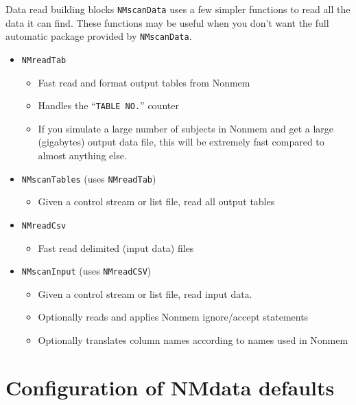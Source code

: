 \documentclass[
  8pt,
  ignorenonframetext,
  aspectratio=169]{beamer}
\providecommand{\tightlist}{%
  \setlength{\itemsep}{0pt}\setlength{\parskip}{0pt}}
\begin{document}
\begin{frame}[fragile]{Data read building blocks}
\protect\hypertarget{data-read-building-blocks}{}
\texttt{NMscanData} uses a few simpler functions to read all the data it
can find. These functions may be useful when you don't want the full
automatic package provided by \texttt{NMscanData}.

\begin{itemize}
\tightlist
\item
  \texttt{NMreadTab}

  \begin{itemize}
  \tightlist
  \item
    Fast read and format output tables from Nonmem
  \item
    Handles the ``\texttt{TABLE\ NO.}'' counter
  \item
    If you simulate a large number of subjects in Nonmem and get a large
    (gigabytes) output data file, this will be extremely fast compared
    to almost anything else.
  \end{itemize}
\item
  \texttt{NMscanTables} (uses \texttt{NMreadTab})

  \begin{itemize}
  \tightlist
  \item
    Given a control stream or list file, read all output tables
  \end{itemize}
\item
  \texttt{NMreadCsv}

  \begin{itemize}
  \tightlist
  \item
    Fast read delimited (input data) files
  \end{itemize}
\item
  \texttt{NMscanInput} (uses \texttt{NMreadCSV})

  \begin{itemize}
  \tightlist
  \item
    Given a control stream or list file, read input data.
  \item
    Optionally reads and applies Nonmem ignore/accept statements
  \item
    Optionally translates column names according to names used in Nonmem
  \end{itemize}
\end{itemize}
\end{frame}

\hypertarget{configuration-of-nmdata-defaults}{%
\section{Configuration of NMdata
defaults}\label{configuration-of-nmdata-defaults}}
\end{document}
